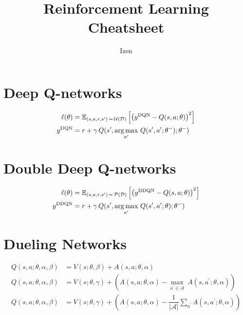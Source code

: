 \documentclass[a4paper,11pt]{article}
\title{Reinforcement Learning Cheatsheet}
\author{Izen}
\newcommand{\obey}{\,\thicksim\,}
\newcommand{\argmax}{\operatorname{arg\,max}}
\newcommand{\app}{a^{\prime}}
\newcommand{\spp}{s^{\prime}}
\newcommand{\thetam}{\theta^{-}}
\begin{document}
\maketitle

\section{Deep Q-networks} %
\label{sec:deep_q_networks}

\begin{align}
	\ell(\theta) &= \mathbb{E}_{(s,a,r,\spp)\obey \mathcal{U}(\mathcal{D})}\left[ \left(y^{\text{DQN}} - Q(s,a;\theta)\right)^2 \right] \\
	y^{\text{DQN}} &= r + \gamma\,Q(\spp,\underset{\app}{\argmax}~Q(\spp,\app;\thetam);\thetam)
\end{align}


\section{Double Deep Q-networks} %
\label{sec:double_deep_q_networks}

\begin{align}
	\ell(\theta) &= \mathbb{E}_{(s,a,r,\spp)\obey \mathcal{P}(\mathcal{D})}\left[ \left(y^{\text{DDQN}} - Q(s,a;\theta)\right)^2 \right] \\
	y^{\text{DDQN}} &= r + \gamma\,Q(\spp,\underset{\app}{\argmax}~Q(\spp,\app;\theta);\thetam)
\end{align}


\section{Dueling Networks} %
\label{sec:dueling_networks}

\begin{align}
	Q(s,a;\theta,\alpha,\beta) &= V(s;\theta,\beta) + A(s,a;\theta,\alpha) \\
	Q(s,a;\theta,\alpha,\beta) &= V(s;\theta,\gamma) + \left( A(s,a;\theta,\alpha)- \underset{\app\in \mathcal{A}}{\max}~A(s,\app;\theta,\alpha) \right) \\
	Q(s,a;\theta,\alpha,\beta) &= V(s;\theta,\gamma) + \left( A(s,a;\theta,\alpha)- \dfrac{1}{\vert \mathcal{A} \vert}\sum_{\app}A(s,\app;\theta,\alpha) \right)
\end{align}


	
\end{document}
